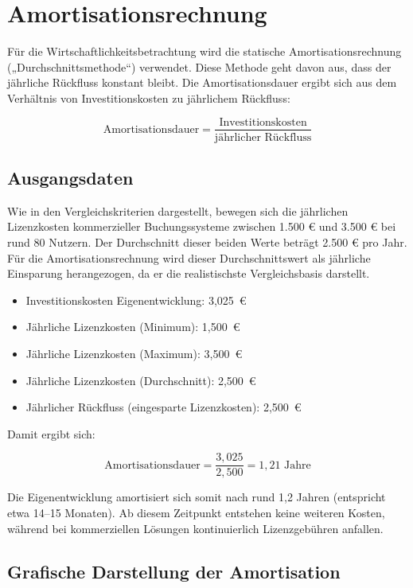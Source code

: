 \documentclass[11pt,a4paper]{report}
\begin{document}
\section{Amortisationsrechnung}

Für die Wirtschaftlichkeitsbetrachtung wird die statische Amortisationsrechnung 
(„Durchschnittsmethode“) verwendet. Diese Methode geht davon aus, dass der jährliche 
Rückfluss konstant bleibt. Die Amortisationsdauer ergibt sich aus dem Verhältnis von 
Investitionskosten zu jährlichem Rückfluss:

\[
\text{Amortisationsdauer} = 
\frac{\text{Investitionskosten}}{\text{jährlicher Rückfluss}}
\]

\subsection{Ausgangsdaten}

Wie in den Vergleichskriterien dargestellt, bewegen sich die jährlichen Lizenzkosten
kommerzieller Buchungssysteme zwischen 1.500 € und 3.500 € bei rund 80 Nutzern.
Der Durchschnitt dieser beiden Werte beträgt 2.500 € pro Jahr. Für die
Amortisationsrechnung wird dieser Durchschnittswert als jährliche Einsparung
herangezogen, da er die realistischste Vergleichsbasis darstellt.

\begin{itemize}
    \item Investitionskosten Eigenentwicklung: 3{,}025 \,€
    \item Jährliche Lizenzkosten (Minimum): 1{,}500 \,€
    \item Jährliche Lizenzkosten (Maximum): 3{,}500 \,€
    \item Jährliche Lizenzkosten (Durchschnitt): 2{,}500 \,€
    \item Jährlicher Rückfluss (eingesparte Lizenzkosten): 2{,}500 \,€
\end{itemize}

Damit ergibt sich:

\[
\text{Amortisationsdauer} = \frac{3{,}025}{2{,}500} = 1{,}21 \text{ Jahre}
\]

Die Eigenentwicklung amortisiert sich somit nach rund 1{,}2 Jahren 
(entspricht etwa 14–15 Monaten). Ab diesem Zeitpunkt entstehen keine weiteren
Kosten, während bei kommerziellen Lösungen kontinuierlich Lizenzgebühren anfallen.

\subsection{Grafische Darstellung der Amortisation}
\end{document}
